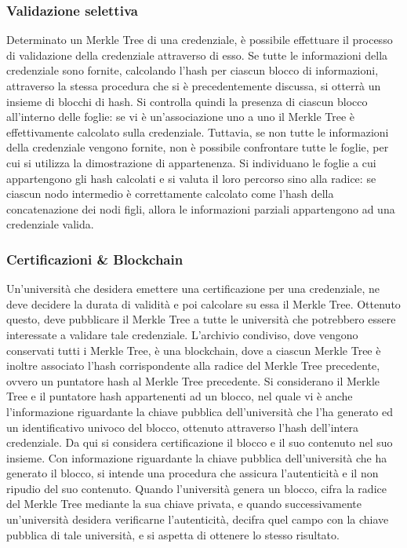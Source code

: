 \documentclass[a4paper,12pt]{article}
\begin{document}
\subsubsection{Validazione selettiva}
Determinato un Merkle Tree di una credenziale, è possibile effettuare il processo di validazione della credenziale attraverso di esso. Se tutte le informazioni della credenziale sono fornite, calcolando l'hash per ciascun blocco di informazioni, attraverso la stessa procedura che si è precedentemente discussa, si otterrà un insieme di blocchi di hash. Si controlla quindi la presenza di ciascun blocco all'interno delle foglie: se vi è un'associazione uno a uno il Merkle Tree è effettivamente calcolato sulla credenziale. 
\newline Tuttavia, se non tutte le informazioni della credenziale vengono fornite, non è possibile confrontare tutte le foglie, per cui si utilizza la dimostrazione di appartenenza. Si individuano le foglie a cui appartengono gli hash calcolati e si valuta il loro percorso sino alla radice: se ciascun nodo intermedio è correttamente calcolato come l'hash della concatenazione dei nodi figli, allora le informazioni parziali appartengono ad una credenziale valida. 
\subsubsection{Certificazioni \& Blockchain} 
Un'università che desidera emettere una certificazione per una credenziale, ne deve decidere la durata di validità e poi calcolare su essa il Merkle Tree. Ottenuto questo, deve pubblicare il Merkle Tree a tutte le università che potrebbero essere interessate a validare tale credenziale. L'archivio condiviso, dove vengono conservati tutti i Merkle Tree, è una blockchain, dove a ciascun Merkle Tree è inoltre associato l'hash corrispondente alla radice del Merkle Tree precedente, ovvero un puntatore hash al Merkle Tree precedente.
\newline Si considerano il Merkle Tree e il puntatore hash 
appartenenti ad un blocco, nel quale vi è anche l'informazione riguardante la chiave pubblica dell'università che l'ha generato ed un identificativo univoco del blocco, ottenuto attraverso l'hash dell'intera credenziale. 
Da qui si considera certificazione il blocco e il suo contenuto nel suo insieme. 
\newline Con informazione riguardante la chiave pubblica dell'università che ha generato il blocco, si intende una procedura che assicura l'autenticità e il non ripudio del suo contenuto.
Quando l'università genera un blocco, cifra la radice del Merkle Tree mediante la sua chiave privata, e quando successivamente un'università desidera verificarne l'autenticità, decifra quel campo con la chiave pubblica di tale università, e si aspetta di ottenere lo stesso risultato.
\end{document}
